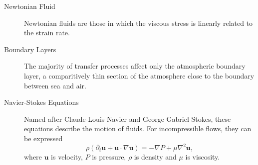 \documentclass{report}
\newcommand{\vel}{\bm{u}}
\newcommand{\del}{\nabla}
\begin{document}
\begin{description}
\item[Newtonian Fluid] Newtonian fluids are those in which the viscous stress is linearly related to the strain rate.\label{def:newtonian}

\item[Boundary Layers]
The majority of transfer processes affect only the atmospheric boundary layer, a comparitively thin section of the atmosphere close to the boundary between sea and air.\label{def:boundarylayer}

\item[Navier-Stokes Equations]
Named after Claude-Louis Navier and George Gabriel Stokes, these equations describe the motion of fluids.
For incompressible flows, they can be expressed
\begin{equation}
\rho (\partial_t \vel + \vel \cdot \del \vel) = -\del P + \mu \del^2 \vel,
\label{eq:navierstokes}
\end{equation}
where $\vel$ is velocity, $P$ is pressure, $\rho$ is density and $\mu$ is viscosity.
\label{def:navierstokes}
\end{description}
\end{document}
